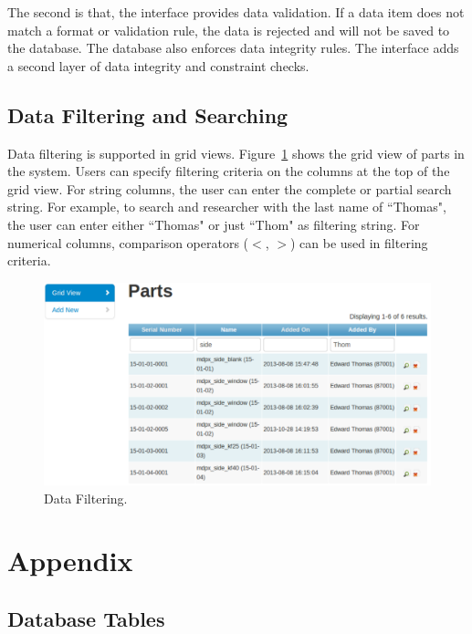 The second is that, the interface provides data validation. If a data item does not match a format or validation rule, the data is rejected and will not be saved to the database. The database also enforces data integrity rules. The interface adds a second layer of data integrity and constraint checks.

\subsection{Data Filtering and Searching}

Data filtering is supported in grid views. Figure~\ref{fig:grid_filter} shows the grid view of parts in the system. Users can specify filtering criteria on the columns at the top of the grid view. For string columns, the user can enter the complete or partial search string. For example, to search and researcher with the last name of ``Thomas", the user can enter either ``Thomas" or just ``Thom" as filtering string. For numerical columns, comparison operators ($<$, $>$) can be used in filtering criteria.

\begin{figure}[h]
\centering
\includegraphics[width=6in]{grid_filter.pdf}
\caption{Data Filtering.\label{fig:grid_filter}}
\end{figure}


\section{Appendix}
\subsection{Database Tables}\label{app_db_schema}

